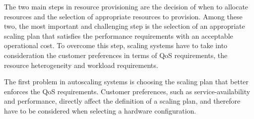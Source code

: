 

The two main steps in resource provisioning are the decision of when to allocate resources and the selection of appropriate resources to provision.
Among these two, the most important and challenging step is the selection of an appropriate scaling plan that satisfies the performance requirements with an acceptable operational cost. 
To overcome this step, scaling systems have to take into consideration the customer preferences in terms of QoS requirements, the resource heterogeneity and workload requirements.

The first problem in autoscaling systems is choosing the scaling plan that better enforces the QoS requirements. Customer preferences, such as service-availability and performance, directly affect the definition of a scaling plan, and therefore have to be considered when selecting a hardware configuration.





